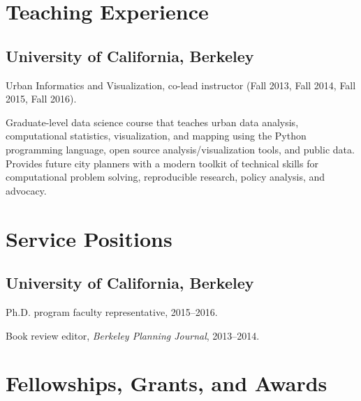 \documentclass[11pt,letterpaper]{report}
\renewenvironment{itemize}{
  \begin{list}{}{
      \setlength{\leftmargin}{1.75em}
      \setlength{\itemsep}{0.25em}
      \setlength{\parskip}{0em}
      \setlength{\parsep}{0.25em}
    }
}{
  \end{list}
}
\begin{document}
\section*{Teaching Experience}

\subsection*{University of California, Berkeley}

\begin{itemize}
\item Urban Informatics and Visualization, co-lead instructor (Fall 2013, Fall 2014, Fall 2015, Fall 2016).
  \begin{itemize}	
  \item Graduate-level data science course that teaches urban data analysis, computational statistics, visualization, and mapping using the Python programming language, open source analysis/visualization tools, and public data. Provides future city planners with a modern toolkit of technical skills for computational problem solving, reproducible research, policy analysis, and advocacy.
  \end{itemize}
\end{itemize}



\section*{Service Positions}

\subsection*{University of California, Berkeley}

\begin{itemize}
\item Ph.D. program faculty representative, 2015--2016.
\item Book review editor, \emph{Berkeley Planning Journal}, 2013--2014.
\end{itemize}


\section*{Fellowships, Grants, and Awards}
\end{document}
